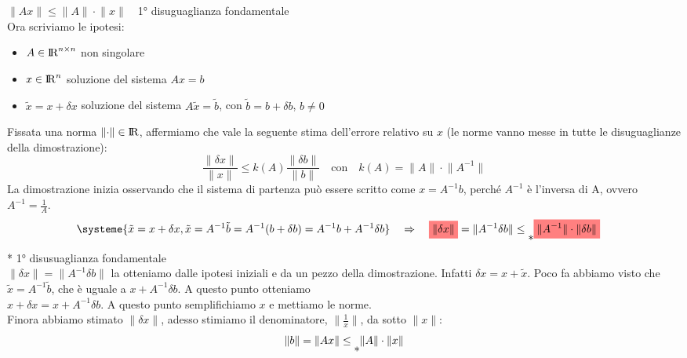 $\lVert Ax \rVert \leq \lVert A \rVert \cdot \lVert x \rVert \quad $1° disuguaglianza fondamentale\\
Ora scriviamo le ipotesi:
\begin{itemize}
    \item $A \in {\rm I\!R}^{n\times n}$ non singolare
    \item $x \in {\rm I\!R}^n$ soluzione del sistema $Ax=b$
    \item $\tilde{x}=x+\delta x$ soluzione del sistema $A\tilde{x}=\tilde{b}$, con $\tilde{b}=b+\delta b$, $b \neq 0$
\end{itemize}
Fissata una norma $\lVert \cdot \rVert \in {\rm I\!R}$, affermiamo che vale la seguente stima dell'errore relativo su $x$ (le norme vanno messe in tutte le disuguaglianze della dimostrazione):\\
\begin{displaymath}
    \frac{\lVert \delta x \rVert}{\lVert x \rVert} \leq k(A)\frac{\lVert \delta b \rVert}{\lVert b\rVert} \quad \text{con} \quad k(A)=\lVert A \rVert \cdot \lVert A^{-1}\rVert
\end{displaymath}
La dimostrazione inizia osservando che il sistema di partenza può essere scritto come $x=A^{-1}b$, perché $A^{-1}$ è l'inversa di A, ovvero $A^{-1}=\frac{1}{A}$.
\begin{align*}
    &\systeme{\tilde{x} = x+\delta x, \tilde{x} = A^{-1}\tilde{b}=A^{-1}(b+\delta b) = A^{-1}b + A^{-1}\delta b}  \quad \Rightarrow \quad \highlightRED{\lVert \delta x \rVert} = \lVert A^{-1}\delta b \rVert \leq \raisebox{-10pt}{*} \highlightRED{\lVert A^{-1} \rVert \cdot \lVert \delta b \rVert}
\end{align*}
* 1° disusuaglianza fondamentale\\
$\lVert \delta x \rVert = \lVert A^{-1}\delta b \rVert$ la otteniamo dalle ipotesi iniziali e da un pezzo della dimostrazione. Infatti $\delta x=x+\tilde{x}$. Poco fa abbiamo visto che $\tilde{x}=A^{-1}\tilde{b}$, che è uguale a $x+A^{-1}\delta b$. A questo punto otteniamo\\ $x+\delta x=x+A^{-1}\delta b$. A questo punto semplifichiamo $x$ e mettiamo le norme.\\
Finora abbiamo stimato $\lVert \delta x \rVert$, adesso stimiamo il denominatore, $\lVert \frac{1}{x} \rVert$, da sotto $\lVert x \rVert$:\\
\begin{displaymath}
    \lVert b \rVert=\lVert Ax \rVert \leq \raisebox{-10pt}{*} \lVert A \rVert \cdot \lVert x \rVert
\end{displaymath}
